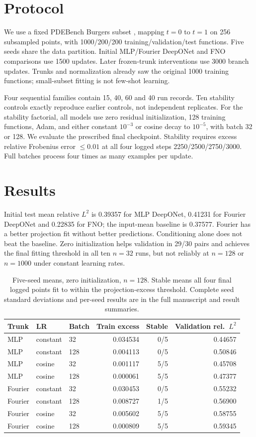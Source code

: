 \documentclass[10pt]{article}
\begin{document}
\section{Protocol}
We use a fixed PDEBench Burgers subset \cite{pdebench}, mapping $t=0$ to $t=1$
on 256 subsampled points, with 1000/200/200 training/validation/test functions.
Five seeds share the data partition. Initial MLP/Fourier DeepONet and FNO comparisons
use 1500 updates. Later frozen-trunk interventions use 3000 branch updates.
Trunks and normalization already saw the original 1000 training functions;
small-subset fitting is not few-shot learning.

Four sequential families contain 15, 40, 60 and 40 run records.
Ten stability controls exactly reproduce earlier controls, not independent replicates.
For the stability factorial, all models use zero residual initialization, 128 training
functions, Adam, and either constant $10^{-3}$ or cosine decay to $10^{-5}$, with batch
32 or 128. We evaluate the prescribed final checkpoint. Stability requires excess
relative Frobenius error $\leq0.01$ at all four logged steps
2250/2500/2750/3000. Full batches process four times as many examples per update.

\section{Results}
Initial test mean relative $L^2$ is 0.39357 for MLP DeepONet, 0.41231 for Fourier
DeepONet and 0.22835 for FNO; the input-mean baseline is 0.37577.
Fourier has a better projection fit without better predictions. Conditioning alone
does not beat the baseline. Zero initialization helps validation in 29/30 pairs
and achieves the final fitting threshold in all ten $n=32$ runs, but not reliably
at $n=128$ or $n=1000$ under constant learning rates.

\begin{table}[ht]
\centering\small
\begin{tabular}{lllrrr}
\toprule
Trunk & LR & Batch & Train excess & Stable & Validation rel.\ $L^2$\\
\midrule
MLP & constant & 32 & 0.034534 & 0/5 & 0.44657\\
MLP & constant & 128 & 0.004113 & 0/5 & 0.50846\\
MLP & cosine & 32 & 0.001117 & 5/5 & 0.45708\\
MLP & cosine & 128 & 0.000061 & 5/5 & 0.47377\\
Fourier & constant & 32 & 0.030453 & 0/5 & 0.55232\\
Fourier & constant & 128 & 0.008727 & 1/5 & 0.56900\\
Fourier & cosine & 32 & 0.005602 & 5/5 & 0.58755\\
Fourier & cosine & 128 & 0.000809 & 5/5 & 0.59345\\
\bottomrule
\end{tabular}
\caption{Five-seed means, zero initialization, $n=128$. Stable means all four final
logged points fit to within the projection-excess threshold. Complete seed standard
deviations and per-seed results are in the full manuscript and result summaries.}
\end{table}
\end{document}
